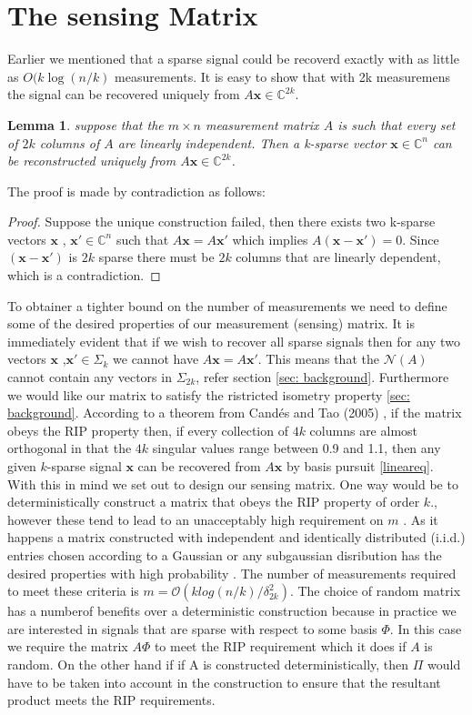 \documentclass[11pt,twoside,a4paper]{article}
\begin{document}
\section{The sensing Matrix}
Earlier we mentioned that a sparse signal could be recoverd exactly with as little as $O(k\log(n/k)$ measurements. It is easy to show that with 2k measuremens the signal can be recovered uniquely from $A\mathbf{x}\in {\mathbb{C}}^{2k}$.
\newtheorem{rec}{Lemma}[section]
\begin{rec}\cite{TT}
suppose that the $m \times n$ measurement matrix $A$ is such that every set of $2k$ columns of $A$ are linearly independent. Then a k-sparse vector $\mathbf{x}\in{\mathbb{C}}^n$ can be reconstructed uniquely from $A\mathbf{x}\in{\mathbb{C}}^{2k}$.
\end{rec}
The proof is made by contradiction as follows:
\begin{proof}\cite{TT}
Suppose the unique construction failed, then there exists two k-sparse vectors $\mathbf{x}$ , $\mathbf{x}'\in {\mathbb{C}}^n$ such that $A\mathbf{x}=A\mathbf{x}'$ which implies $A(\mathbf{x}-\mathbf{x}')=0$. Since $(\mathbf{x}-\mathbf{x}')$ is $2k$ sparse there must be $2k$ columns that are linearly dependent, which is a contradiction.
\end{proof}
To obtainer a tighter bound on the number of measurements we need to define some of the desired properties of our measurement (sensing) matrix. It is immediately evident that if we wish to recover all sparse signals then for any two vectors $\mathbf{x}$ ,$\mathbf{x}'\in \Sigma_k$ we cannot have $A\mathbf{x}=A\mathbf{x}'$. This means that the $\mathcal{N}(A)$ cannot contain any vectors in $\Sigma_{2k}$, refer section \ref{sec: background}. Furthermore we would like our matrix to satisfy the ristricted isometry property \ref{sec: background}.  According to a theorem from Cand\'es and Tao (2005) \cite{TT}, if the matrix obeys the RIP property then, if every collection of $4k$ columns are almost orthogonal in that the $4k$ singular values range between 0.9 and 1.1, then any given $k$-sparse signal $\mathbf{x}$ can be recovered from $A\mathbf{x}$ by basis pursuit \eqref{lineareq}.
With this in mind we set out to design our sensing matrix. One way would be to deterministically construct a matrix that obeys the RIP property of order $k$., however these tend to lead to an unacceptably high requirement on $m$ \cite{GK}. As it happens a matrix constructed with independent and identically distributed (i.i.d.) entries chosen according to a Gaussian or any subgaussian disribution has the desired properties with high probability \cite{GK}. The number of measurements required to meet these criteria is $m=\mathcal{O}(k log(n/k)/\delta_{2k}^2)$. The choice of random matrix has a numberof benefits over a deterministic construction because in practice we are interested in signals that are sparse with respect to some basis $\Phi$. In this case we require the matrix $A\Phi$ to meet the RIP requirement which it does if $A$ is random. On the other hand if if A is constructed deterministically,  then $\Pi$ would have to be taken into account in the construction to ensure that the resultant product meets the RIP requirements.
\end{document}
